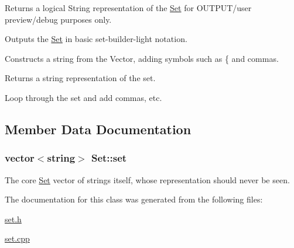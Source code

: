 Returns a logical String representation of the \hyperlink{classSet}{Set} for OUTPUT/user preview/debug purposes only. 

Outputs the \hyperlink{classSet}{Set} in basic set-\/builder-\/light notation.

Constructs a string from the Vector, adding symbols such as \{ and commas. \begin{DoxyReturn}{Returns}
a string representation of the set. 
\end{DoxyReturn}


Loop through the set and add commas, etc. 



\subsection{Member Data Documentation}
\hypertarget{classSet_a074020de568f1ff5a2f4a2033ada72ff}{
\subsubsection[{set}]{\setlength{\rightskip}{0pt plus 5cm}vector$<$string$>$ {\bf Set::set}}}
\label{classSet_a074020de568f1ff5a2f4a2033ada72ff}


The core \hyperlink{classSet}{Set} vector of strings itself, whose representation should never be seen. 



The documentation for this class was generated from the following files:\begin{DoxyCompactItemize}
\item 
\hyperlink{set_8h}{set.h}\item 
\hyperlink{set_8cpp}{set.cpp}\end{DoxyCompactItemize}
